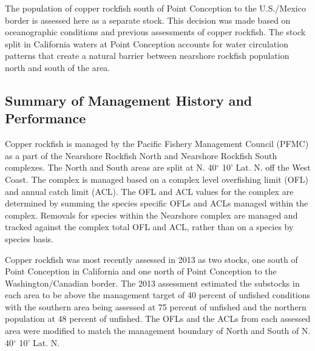 \documentclass[11pt,
  english,
  a4paper,
]{article}
\begin{document}
\leavevmode\tagmcend\tagstructend\par


The population of copper rockfish south of Point Conception to the U.S./Mexico border is assessed here as a separate stock. This decision was made based on oceanographic conditions and previous assessments of copper rockfish. The stock split in California waters at Point Conception accounts for water circulation patterns that create a natural barrier between nearshore rockfish population north and south of the area.

\leavevmode\tagmcend\tagstructend\par


\hypertarget{summary-of-management-history-and-performance}{%
\subsection{Summary of Management History and Performance}\label{summary-of-management-history-and-performance}}

\leavevmode\tagmcend\tagstructend


Copper rockfish is managed by the Pacific Fishery Management Council (PFMC) as a part of the Nearshore Rockfish North and Nearshore Rockfish South complexes. The North and South areas are split at N. 40{\(^\circ\)\leavevmode\tagmcend\tagstructend} 10' Lat. N. off the West Coast. The complex is managed based on a complex level overfishing limit (OFL) and annual catch limit (ACL). The OFL and ACL values for the complex are determined by summing the species specific OFLs and ACLs managed within the complex. Removals for species within the Nearshore complex are managed and tracked against the complex total OFL and ACL, rather than on a species by species basis.

\leavevmode\tagmcend\tagstructend\par


Copper rockfish was most recently assessed in 2013 as two stocks, one south of Point Conception in California and one north of Point Conception to the Washington/Canadian border. The 2013 assessment estimated the substocks in each area to be above the management target of 40 percent of unfished conditions with the southern area being assessed at 75 percent of unfished and the northern population at 48 percent of unfished. The OFLs and the ACLs from each assessed area were modified to match the management boundary of North and South of N. 40{\(^\circ\)\leavevmode\tagmcend\tagstructend} 10' Lat. N.
\end{document}

